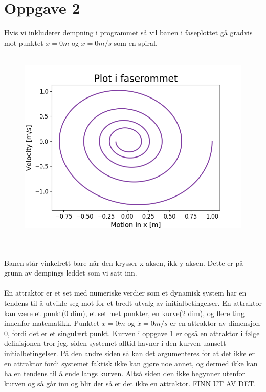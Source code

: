 \documentclass[norsk,a4paper,12pt]{article}
\begin{document}
\section*{Oppgave 2}
Hvis vi inkluderer dempning i programmet så vil banen i faseplottet gå gradvis mot punktet $x = 0m$ og $\dot{x} = 0 m/s$ som en spiral.
\\
\\
\begin{figure}[h]
\begin{center}
\includegraphics[scale=0.8]{Oppgave2.png}
\caption{}
\label{fig:faseplot2}
\end{center}
\end{figure}
\\
\\
Banen står vinkelrett bare når den krysser x aksen, ikk y aksen. Dette er på grunn av dempings leddet som vi satt inn. 
\\
\\
En attraktor er et set med numeriske verdier som et dynamisk system har en tendens til å utvikle seg mot for et bredt utvalg av initialbetingelser. En attraktor kan være et punkt(0 dim), et set met punkter, en kurve(2 dim), og flere ting innenfor matematikk. Punktet $x=0m$ og $\dot{x}=0m/s$ er en attraktor av dimensjon 0, fordi det er et singulært punkt. Kurven i oppgave 1 er også en attraktor i følge definisjonen tror jeg, siden systemet alltid havner i den kurven uansett initialbetingelser. På den andre siden så kan det argumenteres for at det ikke er en attraktor fordi systemet faktisk ikke kan gjøre noe annet, og dermed ikke kan ha en tendens til å ende langs kurven. Altså siden den ikke begynner utenfor kurven og så går inn og blir der så er det ikke en attraktor. FINN UT AV DET.
\end{document}
